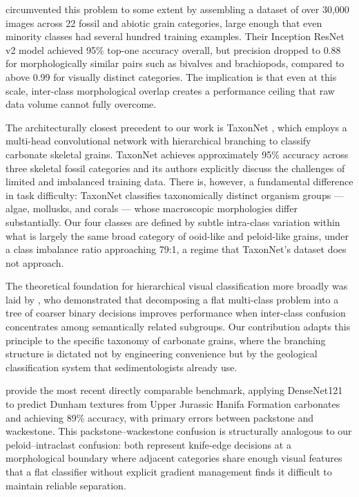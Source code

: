 \documentclass[a4paper,fleqn]{cas-dc}
\begin{document}
\citet{liu2020} circumvented this problem to some extent by assembling a dataset of over 30,000 images across 22 fossil and abiotic grain categories, large enough that even minority classes had several hundred training examples. Their Inception ResNet v2 model achieved 95\% top-one accuracy overall, but precision dropped to 0.88 for morphologically similar pairs such as bivalves and brachiopods, compared to above 0.99 for visually distinct categories. The implication is that even at this scale, inter-class morphological overlap creates a performance ceiling that raw data volume cannot fully overcome.

The architecturally closest precedent to our work is TaxonNet \citep{ho2023}, which employs a multi-head convolutional network with hierarchical branching to classify carbonate skeletal grains. TaxonNet achieves approximately 95\% accuracy across three skeletal fossil categories and its authors explicitly discuss the challenges of limited and imbalanced training data. There is, however, a fundamental difference in task difficulty: TaxonNet classifies taxonomically distinct organism groups --- algae, mollusks, and corals --- whose macroscopic morphologies differ substantially. Our four classes are defined by subtle intra-class variation within what is largely the same broad category of ooid-like and peloid-like grains, under a class imbalance ratio approaching 79:1, a regime that TaxonNet's dataset does not approach.

The theoretical foundation for hierarchical visual classification more broadly was laid by \citet{yan2015hdcnn}, who demonstrated that decomposing a flat multi-class problem into a tree of coarser binary decisions improves performance when inter-class confusion concentrates among semantically related subgroups. Our contribution adapts this principle to the specific taxonomy of carbonate grains, where the branching structure is dictated not by engineering convenience but by the geological classification system that sedimentologists already use.

\citet{liudunham2023} provide the most recent directly comparable benchmark, applying DenseNet121 to predict Dunham textures from Upper Jurassic Hanifa Formation carbonates and achieving 89\% accuracy, with primary errors between packstone and wackestone. This packstone--wackestone confusion is structurally analogous to our peloid--intraclast confusion: both represent knife-edge decisions at a morphological boundary where adjacent categories share enough visual features that a flat classifier without explicit gradient management finds it difficult to maintain reliable separation.
\end{document}
